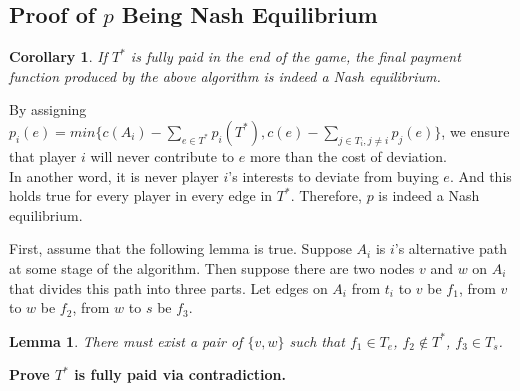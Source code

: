 \documentclass[11pt,psfig,times]{article}
\newtheorem{corollary}{Corollary}[section]
\newtheorem{lemma}{Lemma}[section]
\begin{document}
	
\subsection{Proof of \(p\) Being Nash Equilibrium}
	\begin{corollary}
		If $T^*$ is fully paid in the end of the game, the final payment function produced by the above algorithm is indeed a Nash equilibrium.
	\end{corollary}
	By assigning $p_i(e) = min\{c(A_i) - \sum_{e\in T^*}p_i(T^*), c(e) - \sum_{j\in T_i,j\neq i}p_j(e)\}$, we ensure that player \(i\) will never contribute to \(e\) more than the cost of deviation. \\
	In another word, it is never player $i$'s interests to deviate from buying $e$. And this holds true for every player in every edge in $T^*$. Therefore, \(p\) is indeed a Nash equilibrium. 
	
	First, assume that the following lemma is true. 
	Suppose \(A_i\) is \(i\)'s alternative path at some stage of the algorithm. Then suppose there are two nodes \(v\) and \(w\) on \(A_i\) that divides this path into three parts. Let edges on \(A_i\) from \(t_i\) to \(v\) be \(f_1\), from \(v\) to \(w\) be \(f_2\), from \(w\) to \(s\) be \(f_3\).
	\begin{lemma}
		There must exist a pair of \(\{v,w\}\) such that \(f_1 \in T_e\), \(f_2 \notin T^*\), \(f_3 \in T_s\).
	\end{lemma}
	
	
	\textbf{Prove $T^*$ is fully paid via contradiction.}
	
\end{document}
